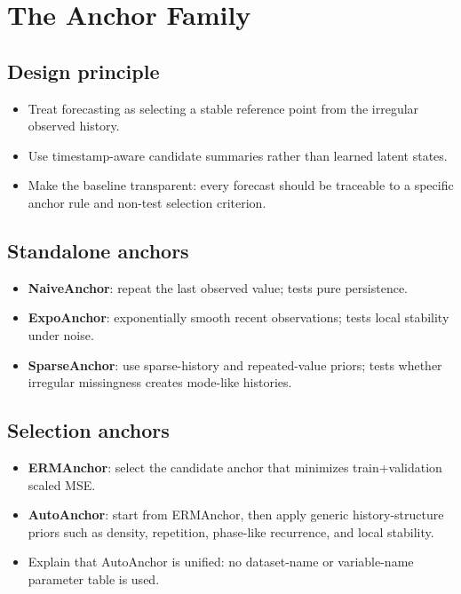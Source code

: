 \documentclass{article}
\newcommand{\method}{AutoAnchor}
\begin{document}
\section{The Anchor Family}


\subsection{Design principle}

\begin{itemize}
    \item Treat forecasting as selecting a stable reference point from the
    irregular observed history.
    \item Use timestamp-aware candidate summaries rather than learned latent
    states.
    \item Make the baseline transparent: every forecast should be traceable to a
    specific anchor rule and non-test selection criterion.
\end{itemize}

\subsection{Standalone anchors}

\begin{itemize}
    \item \textbf{NaiveAnchor}: repeat the last observed value; tests pure
    persistence.
    \item \textbf{ExpoAnchor}: exponentially smooth recent observations; tests
    local stability under noise.
    \item \textbf{SparseAnchor}: use sparse-history and repeated-value priors;
    tests whether irregular missingness creates mode-like histories.
\end{itemize}

\subsection{Selection anchors}

\begin{itemize}
    \item \textbf{ERMAnchor}: select the candidate anchor that minimizes
    train+validation scaled MSE.
    \item \textbf{\method{}}: start from ERMAnchor, then apply generic
    history-structure priors such as density, repetition, phase-like recurrence,
    and local stability.
    \item Explain that \method{} is unified: no dataset-name or variable-name
    parameter table is used.
\end{itemize}
\end{document}

